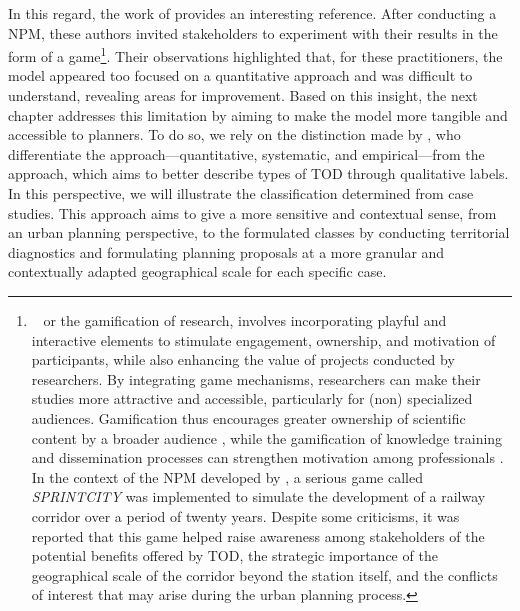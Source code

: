 \begin{refsegment}
In this regard, the work of \textcolor{blue}{\textcite[784]{duffhues_breaking_2014}} provides an interesting reference. After conducting a \acrshort{NPM}, these authors invited stakeholders to experiment with their results in the form of a game\footnote{~
     or the gamification of research, involves incorporating playful and interactive elements to stimulate engagement, ownership, and motivation of participants, while also enhancing the value of projects conducted by researchers. By integrating game mechanisms, researchers can make their studies more attractive and accessible, particularly for (non) specialized audiences. Gamification thus encourages greater ownership of scientific content by a broader audience \textcolor{blue}{\autocite[6]{genvo_approche_2014}}, while the gamification of knowledge training and dissemination processes can strengthen motivation among professionals \textcolor{blue}{\autocite[36, 62]{lu_gamification_2023}}. In the context of the \acrshort{NPM} developed by \textcolor{blue}{\textcite[784]{duffhues_breaking_2014}}, a serious game called \textsl{SPRINTCITY} was implemented to simulate the development of a railway corridor over a period of twenty years. Despite some criticisms, it was reported that this game helped raise awareness among stakeholders of the potential benefits offered by \acrshort{TOD}, the strategic importance of the geographical scale of the corridor beyond the station itself, and the conflicts of interest that may arise during the urban planning process.
}. Their observations highlighted that, for these practitioners, the model appeared too focused on a quantitative approach and was difficult to understand, revealing areas for improvement. Based on this insight, the next chapter addresses this limitation by aiming to make the model more tangible and accessible to planners. To do so, we rely on the distinction made by \textcolor{blue}{\textcite[499]{higgins_forty_2016}}, who differentiate the  approach—quantitative, systematic, and empirical—from the  approach, which aims to better describe types of \acrshort{TOD} through qualitative labels. In this perspective, we will illustrate the classification determined from case studies. This approach aims to give a more sensitive and contextual sense, from an urban planning perspective, to the formulated classes by conducting territorial diagnostics and formulating planning proposals at a more granular and contextually adapted geographical scale for each specific case.%


\end{refsegment}
